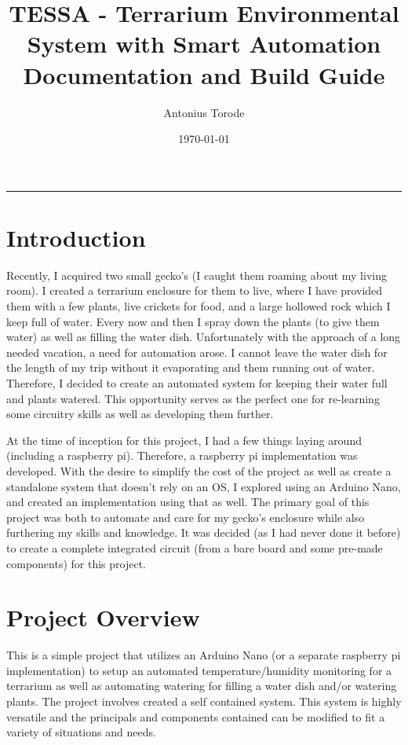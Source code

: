 \documentclass{article}
\title{TESSA - Terrarium Environmental System with Smart Automation\\
	Documentation and Build Guide}
\author{Antonius Torode}
\date{\today}
\begin{document}
	
	\maketitle
	
	\tableofcontents
	
	
	\newpage
	
	\begin{abstract}
		\lipsum[1]
	\end{abstract}
	
		\hrule
		
		\section{Introduction}
		Recently, I acquired two small gecko's (I caught them roaming about my living room). I created a terrarium enclosure for them to live, where I have provided them with a few plants, live crickets for food, and a large hollowed rock which I keep full of water. Every now and then I spray down the plants (to give them water) as well as filling the water dish. Unfortunately with the approach of a long needed vacation, a need for automation arose. I cannot leave the water dish for the length of my trip without it evaporating and them running out of water. Therefore, I decided to create an automated system for keeping their water full and plants watered. This opportunity serves as the perfect one for re-learning some circuitry skills as well as developing them further.
		
		At the time of inception for this project, I had a few things laying around (including a raspberry pi). Therefore, a raspberry pi implementation was developed. With the desire to simplify the cost of the project as well as create a standalone system that doesn't rely on an OS, I explored using an Arduino Nano, and created an implementation using that as well. The primary goal of this project was both to automate and care for my gecko's enclosure while also furthering my skills and knowledge. It was decided (as I had never done it before) to create a complete integrated circuit (from a bare board and some pre-made components) for this project.
		
		\section{Project Overview}
		This is a simple project that utilizes an Arduino Nano (or a separate raspberry pi implementation) to setup an automated temperature/humidity monitoring for a terrarium as well as automating watering for filling a water dish and/or watering plants. The project involves created a self contained system. This system is highly versatile and the principals and components contained can be modified to fit a variety of situations and needs.
\end{document}
